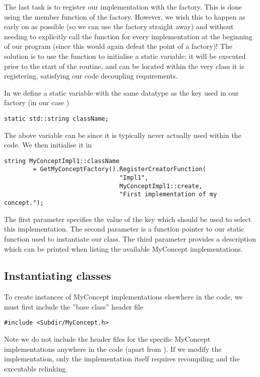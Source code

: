 The last task is to register our implementation with the factory. This is done 
using the  member function of the factory.
However, we wish this to happen as early on as possible (so we can use the 
factory straight away) and without needing to explicitly call the function for 
every implementation at the beginning of our program (since this would again 
defeat the point of a factory)! The solution is to use the function to 
initialise a static variable: it will be executed prior to the start of the
 routine, and can be located within the very class it is
registering, satisfying our code decoupling requirements.

In  we define a static variable with the same datatype
as the key used in our factory (in our case ) 
\begin{lstlisting}[style=C++Style]
static std::string className;
\end{lstlisting}
The above variable can be  since it is typically never actually
used within the code. We then initialise it in 

\begin{lstlisting}[style=C++Style] 
string MyConceptImpl1::className
        = GetMyConceptFactory().RegisterCreatorFunction(
                                "Impl1", 
                                MyConceptImpl1::create, 
                                "First implementation of my concept.");
\end{lstlisting}
The first parameter specifies the value of the key which should be used to
select this implementation. The second parameter is a function pointer to our
static function used to instantiate our class. The third parameter provides a
description which can be printed when listing the available MyConcept
implementations.

\subsection{Instantiating classes}
To create instances of MyConcept implementations elsewhere in the code, we must
first include the ''base class'' header file
\begin{lstlisting}[style=C++Style]
#include <Subdir/MyConcept.h>
\end{lstlisting}
Note we do not include the header files for the specific MyConcept 
implementations anywhere in the code (apart from ).
If we modify the implementation, only the implementation itself requires 
recompiling and the executable relinking.

